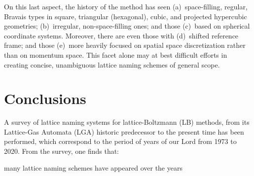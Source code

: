     On this last aspect, the history of the method has seen (a)~space-filling, regular,  Bravais  types  in  square,  triangular
    (hexagonal), cubic, and projected hypercubic geometries; (b)~irregular,  non-space-filling  ones;  and  those  (c)~based  on
    spherical coordinate systems. Moreover, there are even those with (d)~shifted reference frame; and  those  (e)~more  heavily
    focused on spatial space discretization rather than on momentum space. This facet alone may at  best  difficult  efforts  in
    creating concise, unambiguous lattice naming schemes of general scope.



\section{Conclusions}

    A survey of lattice naming systems for lattice-Boltzmann (LB) methods, from its Lattice-Gas Automata (LGA) historic
    predecessor to the present time has been performed, which correspond to the period of years of our Lord from 1973 to 2020.
    From the survey, one finds that:

    many lattice naming schemes have appeared over the years

